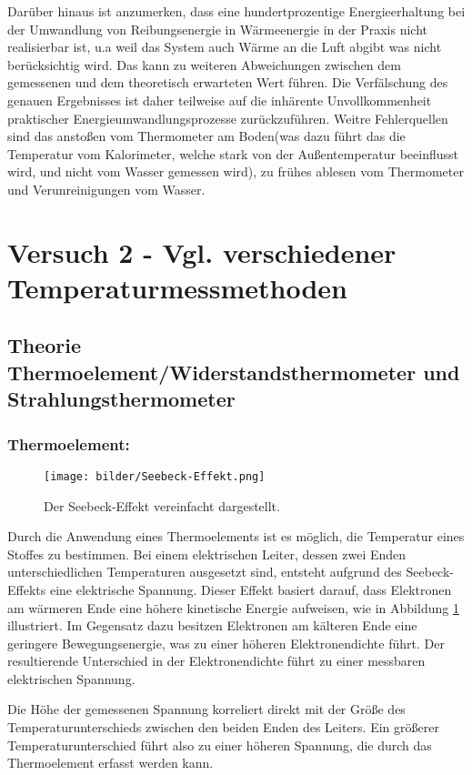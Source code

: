         Darüber hinaus ist anzumerken, dass eine hundertprozentige Energieerhaltung bei der Umwandlung von Reibungsenergie in Wärmeenergie in der Praxis nicht realisierbar ist, u.a weil das System auch Wärme an die Luft abgibt was nicht berücksichtig wird. Das kann zu weiteren Abweichungen zwischen dem gemessenen und dem theoretisch erwarteten Wert führen. Die Verfälschung des genauen Ergebnisses ist daher teilweise auf die inhärente Unvollkommenheit praktischer Energieumwandlungsprozesse zurückzuführen.  Weitre Fehlerquellen sind das anstoßen vom Thermometer am Boden(was dazu führt das die Temperatur vom Kalorimeter, welche stark von der Außentemperatur beeinflusst wird, und nicht vom Wasser gemessen wird), zu frühes ablesen vom Thermometer und Verunreinigungen vom Wasser.


\section{Versuch 2 - Vgl. verschiedener Temperaturmessmethoden}
    \subsection{Theorie Thermoelement/Widerstandsthermometer und Strahlungsthermometer}
    \subsubsection*{Thermoelement:}
    	\begin{figure}[ht]
    	\label{fig:abb2}
    	\begin{center}
    		\texttt{[image: bilder/Seebeck-Effekt.png]}
    		\caption{Der Seebeck-Effekt vereinfacht dargestellt.}
    	\end{center}
    \end{figure}
    Durch die Anwendung eines Thermoelements ist es möglich, die Temperatur eines Stoffes zu bestimmen. Bei einem elektrischen Leiter, dessen zwei Enden unterschiedlichen Temperaturen ausgesetzt sind, entsteht aufgrund des Seebeck-Effekts eine elektrische Spannung. Dieser Effekt basiert darauf, dass Elektronen am wärmeren Ende eine höhere kinetische Energie aufweisen, wie in Abbildung \ref{fig:abb2} illustriert. Im Gegensatz dazu besitzen Elektronen am kälteren Ende eine geringere Bewegungsenergie, was zu einer höheren Elektronendichte führt. Der resultierende Unterschied in der Elektronendichte führt zu einer messbaren elektrischen Spannung.
    
   Die Höhe der gemessenen Spannung korreliert direkt mit der Größe des Temperaturunterschieds zwischen den beiden Enden des Leiters. Ein größerer Temperaturunterschied führt also zu einer höheren Spannung, die durch das Thermoelement erfasst werden kann.
